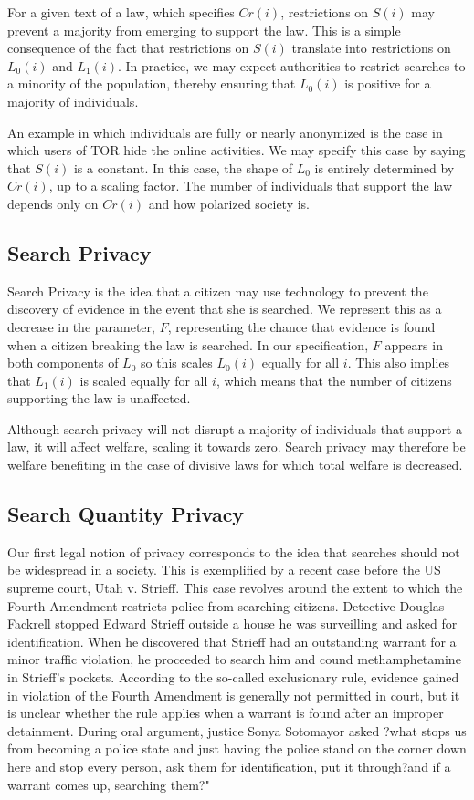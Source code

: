 For a given text of a law, which specifies $Cr(i)$, restrictions on $S(i)$ may prevent a majority from emerging to support the law.  This is a simple consequence of the fact that restrictions on $S(i)$ translate into restrictions on $L_0(i)$ and $L_1(i)$.  In practice, we may expect authorities to restrict searches to a minority of the population, thereby ensuring that $L_0(i)$ is positive for a majority of individuals.

An example in which individuals are fully or nearly anonymized is the case in which users of TOR hide the online activities.  We may specify this case by saying that $S(i)$ is a constant.  In this case, the shape of $L_0$ is entirely determined by $Cr(i)$, up to a scaling factor.  The number of individuals that support the law depends only on $Cr(i)$ and how polarized society is.

\subsection{Search Privacy}

Search Privacy is the idea that a citizen may use technology to prevent the discovery of evidence in the event that she is searched.  We represent this as a decrease in the parameter, $F$, representing the chance that evidence is found when a citizen breaking the law is searched.  In our specification, $F$ appears in both components of $L_0$ so this scales $L_0(i)$ equally for all $i$.  This also implies that $L_1(i)$ is scaled equally for all $i$, which means that the number of citizens supporting the law is unaffected.

Although search privacy will not disrupt a majority of individuals that support a law, it will affect welfare, scaling it towards zero.  Search privacy may therefore be welfare benefiting in the case of divisive laws for which total welfare is decreased.

\subsection{Search Quantity Privacy}

Our first legal notion of privacy corresponds to the idea that searches should not be widespread in a society.  This is exemplified by a recent case before the US supreme court, Utah v. Strieff.  This case revolves around the extent to which the Fourth Amendment restricts police from searching citizens.  Detective Douglas Fackrell stopped Edward Strieff outside a house he was surveilling and asked for identification.  When he discovered that Strieff had an outstanding warrant for a minor traffic violation, he proceeded to search him and cound methamphetamine in Strieff's pockets.  According to the so-called exclusionary rule, evidence gained in violation of the Fourth Amendment is generally not permitted in court, but it is unclear whether the rule applies when a warrant is found after an improper detainment.  During oral argument, justice Sonya Sotomayor asked ?what stops us from becoming a police state and just having the police stand on the corner down here and stop every person, ask them for identification, put it through?and if a warrant comes up, searching them?"


